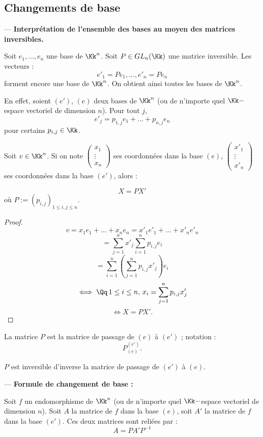 \documentclass[class=report,crop=false]{standalone}
\newcommand{\GL}{GL}
\begin{document}
\subsection{Changements de base}

--- {\bf Interprétation de l'ensemble des bases au moyen des matrices inversibles.}

Soit $e_1,...,e_n$ une base de $\Kk^n$. Soit $P \in \GL_n(\Kk)$ une matrice inversible. Les vecteurs :
\[e'_1=Pe_1,...,e'_n=Pe_n\]
forment encore une base de $\Kk^n$. On obtient ainsi toutes les bases de $\Kk^n$.


En effet, soient $(e')$, $(e)$ deux bases de $\Kk^n$ (ou de n'importe quel $\Kk-$espace vectoriel de dimension $n$). Pour tout $j$,
\[e'_j = p_{1,j}e_1 + ... + p_{n,j}e_n\]
pour certains $p_{i,j} \in \Kk$.

Soit $ v \in \Kk^n$. Si on note $\left(\begin{array}{c}
x_1\\
\vdots\\
x_n
\end{array}\right)$ ses coordonnées dans la base $(e)$, $\left(\begin{array}{c}
x'_1\\
\vdots\\
x'_n
\end{array}\right)$ ses coordonnées dans la base $(e')$, alors :

\[X = PX'\]
où $P:= (p_{i,j})_{1 \le i,j\le n}$.

\begin{proof}
\[v = x_1e_1 +...+x_n e_n = x'_1e'_1+...+x'_ne'_n\]
\[= \sum_{j=1}^nx'_j \sum_{i=1}^n p_{i,j}e_i\]
\[= \sum_{i=1}^n \left(\sum_{j=1}^np_{i,j}x'_j\right)e_i\]
\[\iff \Qq\, 1 \le i \le n,\, x_i = \sum_{j=1}^np_{i,j}x'_j\]
\[\iff X = PX' .\]
\end{proof}



\begin{definition}
La matrice $P$ est la matrice de passage de $(e)$ à $(e')$ ; notation : \[P_{(e)}^{(e')} .\] 
\end{definition}

\begin{exercicecours}
$P$ est inversible d'inverse la matrice de passage de $(e')$ à $(e)$.
\end{exercicecours}


--- {\bf Formule de changement de base :}

Soit $f$ un endomorphisme de $\Kk^n$ (ou de n'importe quel $\Kk-$espace vectoriel de dimension $n$). Soit $A$ la matrice de $f$ dans la base $(e)$, soit $A'$ la matrice de $f$ dans la base $(e')$. Ces deux matrices sont reliées par :
\[A = P A'P^{-1}\]
\end{document}
